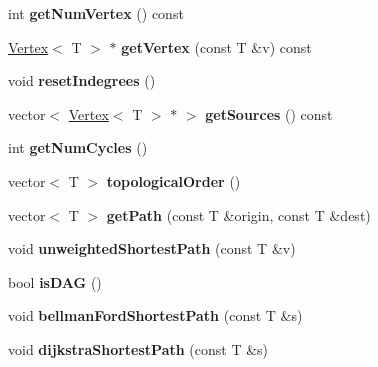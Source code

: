 \begin{DoxyCompactItemize}
\item 
\hypertarget{classGraph_a295932f117d92c825a97ec458e0fb332}{int {\bfseries get\-Num\-Vertex} () const }\label{classGraph_a295932f117d92c825a97ec458e0fb332}

\item 
\hypertarget{classGraph_a08a95472b0d9bd7321660940807af060}{\hyperlink{classVertex}{Vertex}$<$ T $>$ $\ast$ {\bfseries get\-Vertex} (const T \&v) const }\label{classGraph_a08a95472b0d9bd7321660940807af060}

\item 
\hypertarget{classGraph_af34eb86d804272e6e3e221a9ed688c53}{void {\bfseries reset\-Indegrees} ()}\label{classGraph_af34eb86d804272e6e3e221a9ed688c53}

\item 
\hypertarget{classGraph_af9502cbf025cc7c7c84d266567d59141}{vector$<$ \hyperlink{classVertex}{Vertex}$<$ T $>$ $\ast$ $>$ {\bfseries get\-Sources} () const }\label{classGraph_af9502cbf025cc7c7c84d266567d59141}

\item 
\hypertarget{classGraph_a694dff81073c38b669057f0c6bd4cbb1}{int {\bfseries get\-Num\-Cycles} ()}\label{classGraph_a694dff81073c38b669057f0c6bd4cbb1}

\item 
\hypertarget{classGraph_ae2305ca51e55cf59fe41735a73e9be09}{vector$<$ T $>$ {\bfseries topological\-Order} ()}\label{classGraph_ae2305ca51e55cf59fe41735a73e9be09}

\item 
\hypertarget{classGraph_ab4054ca572c10669dd3e05d6d41c116c}{vector$<$ T $>$ {\bfseries get\-Path} (const T \&origin, const T \&dest)}\label{classGraph_ab4054ca572c10669dd3e05d6d41c116c}

\item 
\hypertarget{classGraph_ae5264597aacaf4f45819e96a6d6c89aa}{void {\bfseries unweighted\-Shortest\-Path} (const T \&v)}\label{classGraph_ae5264597aacaf4f45819e96a6d6c89aa}

\item 
\hypertarget{classGraph_ab49d07c2bd6b8b30d5ae82bc558b821a}{bool {\bfseries is\-D\-A\-G} ()}\label{classGraph_ab49d07c2bd6b8b30d5ae82bc558b821a}

\item 
\hypertarget{classGraph_a1d6769b79beaa76f78fd9c9209833bef}{void {\bfseries bellman\-Ford\-Shortest\-Path} (const T \&s)}\label{classGraph_a1d6769b79beaa76f78fd9c9209833bef}

\item 
\hypertarget{classGraph_a445a38cf4045797198eae2b818b602de}{void {\bfseries dijkstra\-Shortest\-Path} (const T \&s)}\label{classGraph_a445a38cf4045797198eae2b818b602de}


\end{DoxyCompactItemize}
